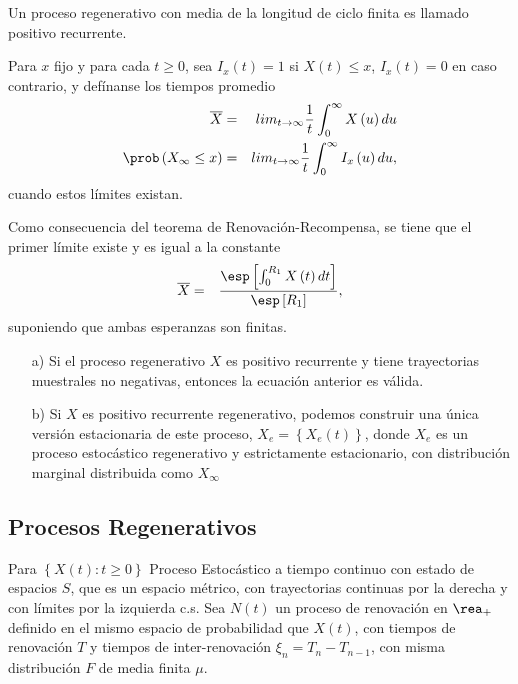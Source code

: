 \begin{Note}
Un proceso regenerativo con media de la longitud de ciclo finita es llamado positivo recurrente.
\end{Note}


\begin{Def}
Para $x$ fijo y para cada $t\geq0$, sea $I_{x}\left(t\right)=1$ si $X\left(t\right)\leq x$,  $I_{x}\left(t\right)=0$ en caso contrario, y def\'inanse los tiempos promedio
\begin{eqnarray*}
\overline{X}&=&lim_{t\rightarrow\infty}\frac{1}{t}\int_{0}^{\infty}X\left(u\right)du\\
\prob\left(X_{\infty}\leq x\right)&=&lim_{t\rightarrow\infty}\frac{1}{t}\int_{0}^{\infty}I_{x}\left(u\right)du,
\end{eqnarray*}
cuando estos l\'imites existan.
\end{Def}

Como consecuencia del teorema de Renovaci\'on-Recompensa, se tiene que el primer l\'imite  existe y es igual a la constante
\begin{eqnarray*}
\overline{X}&=&\frac{\esp\left[\int_{0}^{R_{1}}X\left(t\right)dt\right]}{\esp\left[R_{1}\right]},
\end{eqnarray*}
suponiendo que ambas esperanzas son finitas.

\begin{Note}
\begin{itemize}
\item[a)] Si el proceso regenerativo $X$ es positivo recurrente y tiene trayectorias muestrales no negativas, entonces la ecuaci\'on anterior es v\'alida.
\item[b)] Si $X$ es positivo recurrente regenerativo, podemos construir una \'unica versi\'on estacionaria de este proceso, $X_{e}=\left\{X_{e}\left(t\right)\right\}$, donde $X_{e}$ es un proceso estoc\'astico regenerativo y estrictamente estacionario, con distribuci\'on marginal distribuida como $X_{\infty}$
\end{itemize}
\end{Note}

\subsection{Procesos Regenerativos}

Para $\left\{X\left(t\right):t\geq0\right\}$ Proceso Estoc\'astico a tiempo continuo con estado de espacios $S$, que es un espacio m\'etrico, con trayectorias continuas por la derecha y con l\'imites por la izquierda c.s. Sea $N\left(t\right)$ un proceso de renovaci\'on en $\rea_{+}$ definido en el mismo espacio de probabilidad que $X\left(t\right)$, con tiempos de renovaci\'on $T$ y tiempos de inter-renovaci\'on $\xi_{n}=T_{n}-T_{n-1}$, con misma distribuci\'on $F$ de media finita $\mu$.



